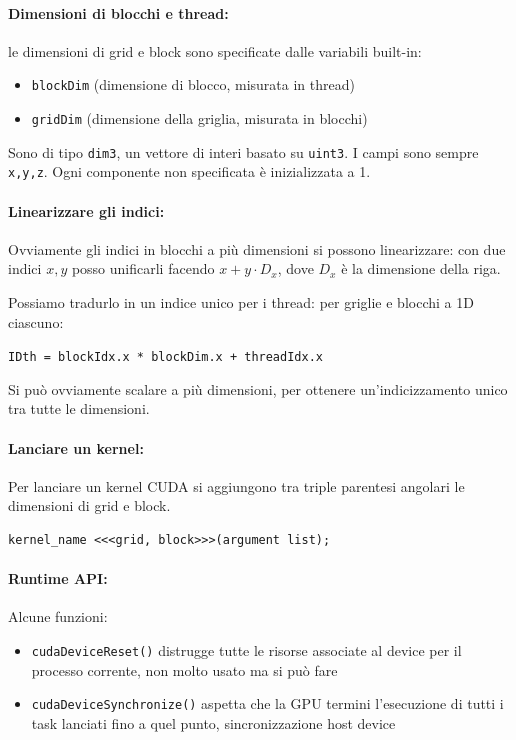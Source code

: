 \paragraph{Dimensioni di blocchi e thread:} le dimensioni di grid e block sono specificate dalle variabili built-in: 
\begin{itemize}
	\item \texttt{blockDim} (dimensione di blocco, misurata in thread)
	
	\item \texttt{gridDim} (dimensione della griglia, misurata in blocchi)
\end{itemize}

Sono di tipo \texttt{dim3}, un vettore di interi basato su \texttt{uint3}. I campi sono sempre \texttt{x,y,z}. Ogni componente non specificata è inizializzata a 1.

\paragraph{Linearizzare gli indici:} Ovviamente gli indici in blocchi a più dimensioni si possono linearizzare: con due indici $x,y$ posso unificarli facendo $x + y \cdot D_x$, dove $D_x$ è la dimensione della riga.

Possiamo tradurlo in un indice unico per i thread: per griglie e blocchi a 1D ciascuno: 
\begin{center}
	\texttt{IDth = blockIdx.x * blockDim.x + threadIdx.x}
\end{center}
Si può ovviamente scalare a più dimensioni, per ottenere un'indicizzamento unico tra tutte le dimensioni. 

\paragraph{Lanciare un kernel:} Per lanciare un kernel CUDA si aggiungono tra triple parentesi angolari le dimensioni di grid e block.
\begin{verbatim}
kernel_name <<<grid, block>>>(argument list);
\end{verbatim}

\paragraph{Runtime API:} Alcune funzioni:
\begin{itemize}
	\item \texttt{cudaDeviceReset()} distrugge tutte le risorse associate al device per il processo corrente, non molto usato ma si può fare
	
	\item \texttt{cudaDeviceSynchronize()} aspetta che la GPU termini l'esecuzione di tutti i task lanciati fino a quel punto, sincronizzazione host device
\end{itemize}

